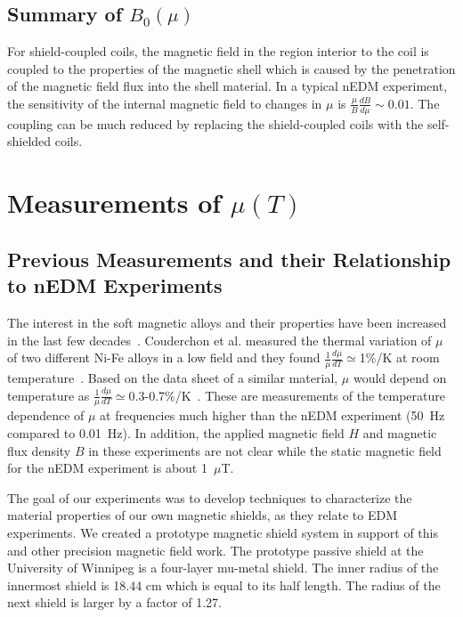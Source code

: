 \documentclass[review]{elsarticle}
\begin{document}
\subsection{Summary of $B_0(\mu)$}

For shield-coupled coils, the magnetic field in the region interior
to the coil is coupled to the properties of the magnetic shell which is caused
by the penetration of the magnetic field flux into the shell material. In a
typical nEDM experiment, the sensitivity of the internal magnetic
field to changes in $\mu$ is $\frac{\mu}{B}\frac{dB}{d\mu}\sim 0.01$.
The coupling can be much reduced by replacing the shield-coupled coils
with the self-shielded coils.


\section{Measurements of $\mu(T)$}

\subsection{Previous Measurements and their Relationship to nEDM Experiments\label{previousmeasurement}}

The interest in the soft magnetic alloys and their properties have
been increased in the last few
decades~\cite{bib:pfeifer,bib:bozorth,bib:couderchon}. Couderchon et
al. measured the thermal variation of $\mu$ of two different Ni-Fe
alloys in a low field and they found
$\frac{1}{\mu}\frac{d\mu}{dT}\simeq$1\%/K at room
temperature~\cite{bib:couderchon}. Based on the data sheet of a
similar material, $\mu$ would depend on temperature as
$\frac{1}{\mu}\frac{d\mu}{dT}\simeq$0.3-0.7\%/K~\cite{bib:kruppvdm}. These
are measurements of the temperature dependence of $\mu$ at frequencies
much higher than the nEDM experiment (50~Hz compared to 0.01~Hz). In
addition, the applied magnetic field $H$ and magnetic flux density $B$
in these experiments are not clear while the static magnetic field for
the nEDM experiment is about 1~$\mu$T.

The goal of our experiments was to develop techniques to characterize
the material properties of our own magnetic shields, as they relate to
EDM experiments.  We created a prototype magnetic shield system in
support of this and other precision magnetic field work.  The
prototype passive shield at the University of Winnipeg is a four-layer
mu-metal shield. The inner radius of the innermost shield is 18.44 cm
which is equal to its half length. The radius of the next shield is
larger by a factor of 1.27.
\end{document}
